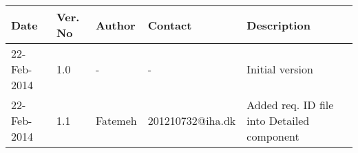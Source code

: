 \begin{center}
    \begin{tabular}{ | l | p{1cm} | l | l | p{5cm} |}
    \hline
    Date&Ver. No & Author &Contact &Description\\ \hline
	22-Feb-2014&1.0 & - & - & Initial version\\
    \hline
    	22-Feb-2014&1.1 & Fatemeh & 201210732@iha.dk & Added req. ID file into Detailed component \\
    \hline
    \end{tabular}
\end{center}